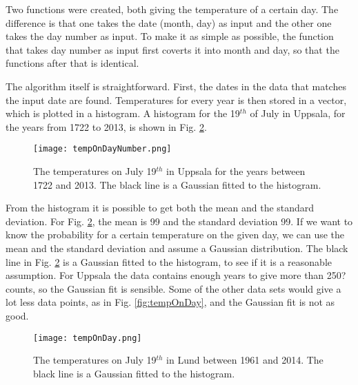 


Two functions were created, both giving the temperature of a certain day. The difference is that one takes the date (month, day) as input and the other one takes the day number as input. To make it as simple as possible, the function that takes day number as input first coverts it into month and day, so that the functions after that is identical. 

The algorithm itself is straightforward. First, the dates in the data that matches the input date are found. Temperatures for every year is then stored in a vector, which is plotted in a histogram. A histogram for the 19$^{th}$ of July in Uppsala, for the years from 1722 to 2013, is shown in Fig. \ref{fig:tempOnDayNumber}.

\begin{figure}[h]
\texttt{[image: tempOnDayNumber.png]}
\caption{\label{fig:tempOnDayNumber} The temperatures on July 19$^{th}$ in Uppsala for the years between 1722 and 2013. The black line is a Gaussian fitted to the histogram.}
\end{figure}

From the histogram it is possible to get both the mean and the standard deviation. For Fig. \ref{fig:tempOnDayNumber}, the mean is 99 and the standard deviation 99. If we want to know the probability for a certain temperature on the given day, we can use the mean and the standard deviation and assume a Gaussian distribution. The black line in Fig. \ref{fig:tempOnDayNumber} is a Gaussian fitted to the histogram, to see if it is a reasonable assumption. For Uppsala the data contains enough years to give more than 250? counts, so the Gaussian fit is sensible. Some of the other data sets would give a lot less data points, as in Fig. \ref{fig:tempOnDay}, and the Gaussian fit is not as good. 

\begin{figure}[h]
\texttt{[image: tempOnDay.png]}
\caption{\label{fig:tempOnDayNumber} The temperatures on July 19$^{th}$ in Lund between 1961 and 2014. The black line is a Gaussian fitted to the histogram.}
\end{figure}


